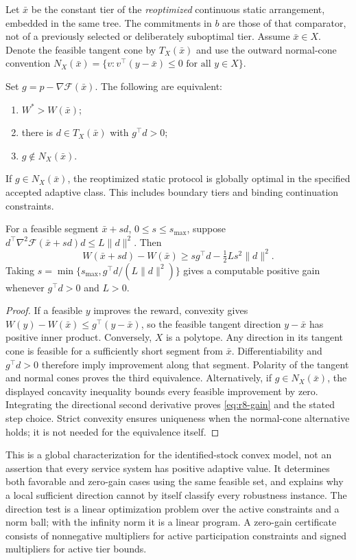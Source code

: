 Let $\bar x$ be the constant tier of the \emph{reoptimized} continuous static arrangement, embedded in the same tree. The commitments in $b$ are those of that comparator, not of a previously selected or deliberately suboptimal tier. Assume $\bar x\in X$. Denote the feasible tangent cone by $T_X(\bar x)$ and use the outward normal-cone convention
$N_X(\bar x)=\{v:v^\top(y-\bar x)\leq0\text{ for all }y\in X\}$.
\begin{theorem}\label{thm:r8-alternative}
Set $g=p-\nabla\mathcal F(\bar x)$. The following are equivalent:
\begin{enumerate}
\item $W^*>W(\bar x)$;
\item there is $d\in T_X(\bar x)$ with $g^\top d>0$;
\item $g\notin N_X(\bar x)$.
\end{enumerate}
If $g\in N_X(\bar x)$, the reoptimized static protocol is globally optimal in the specified accepted adaptive class. This includes boundary tiers and binding continuation constraints.

For a feasible segment $\bar x+sd$, $0\leq s\leq s_{\max}$, suppose
$d^\top\nabla^2\mathcal F(\bar x+sd)d\leq L\|d\|^2$. Then
\begin{equation}\label{eq:r8-gain}
 W(\bar x+sd)-W(\bar x)\geq s g^\top d-\tfrac12Ls^2\|d\|^2.
\end{equation}
Taking $s=\min\{s_{\max},g^\top d/(L\|d\|^2)\}$ gives a computable positive gain whenever $g^\top d>0$ and $L>0$.
\end{theorem}
\begin{proof}
If a feasible $y$ improves the reward, convexity gives
$W(y)-W(\bar x)\leq g^\top(y-\bar x)$, so the feasible tangent direction $y-\bar x$ has positive inner product. Conversely, $X$ is a polytope. Any direction in its tangent cone is feasible for a sufficiently short segment from $\bar x$. Differentiability and $g^\top d>0$ therefore imply improvement along that segment. Polarity of the tangent and normal cones proves the third equivalence. Alternatively, if $g\in N_X(\bar x)$, the displayed concavity inequality bounds every feasible improvement by zero. Integrating the directional second derivative proves \eqref{eq:r8-gain} and the stated step choice. Strict convexity ensures uniqueness when the normal-cone alternative holds; it is not needed for the equivalence itself.
\end{proof}
This is a global characterization for the identified-stock convex model, not an assertion that every service system has positive adaptive value. It determines both favorable and zero-gain cases using the same feasible set, and explains why a local sufficient direction cannot by itself classify every robustness instance. The direction test is a linear optimization problem over the active constraints and a norm ball; with the infinity norm it is a linear program. A zero-gain certificate consists of nonnegative multipliers for active participation constraints and signed multipliers for active tier bounds.

